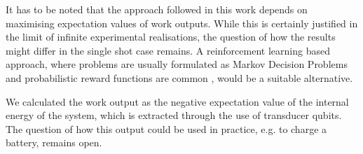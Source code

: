 It has to be noted that the approach followed in this work depends on maximising expectation values of work outputs.
While this is certainly justified in the limit of infinite experimental realisations, the question of how the results might differ in the single shot case remains.
A reinforcement learning based approach, where problems are usually formulated as Markov Decision Problems and probabilistic reward functions are common \cite{Sutton1998}, would be a suitable alternative.

We calculated the work output as the negative expectation value of the internal energy of the system, which is extracted through the use of transducer qubits.
The question of how this output could be used in practice, e.g. to charge a battery, remains open.